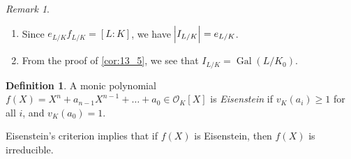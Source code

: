 \documentclass[11pt]{article}
\theoremstyle{definition}
\newtheorem{definition}{Definition}[subsection]
\theoremstyle{plain}
\theoremstyle{remark}
\newtheorem*{remark}{Remark}
\DeclareMathOperator{\Gal}{Gal}
\newcommand{\cO}{\mathcal{O}}
\begin{document}
\begin{remark}\phantom{}
    \begin{enumerate}
        \item Since $e_{L/K} f_{L/K} = [L:K]$, we have $\abs{I_{L/K}} = e_{L/K}$.
        \item From the proof of \autoref{cor:13_5}, we see that $I_{L/K} = \Gal(L/K_0)$.
    \end{enumerate}
\end{remark}

\begin{definition}\label{def:13_7}
    A monic polynomial $f(X) = X^n + a_{n-1} X^{n-1} + \ldots + a_0 \in \cO_K[X]$ is \emph{Eisenstein} if $v_K(a_i) \ge 1$ for all $i$, and $v_K(a_0) = 1$.
\end{definition}

\noindent Eisenstein's criterion implies that if $f(X)$ is Eisenstein, then $f(X)$ is irreducible.
\end{document}
